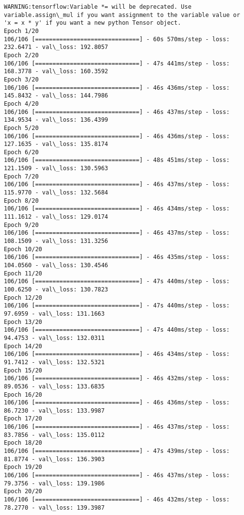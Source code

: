 \documentclass[11pt]{article}
\begin{document}
    \begin{Verbatim}[commandchars=\\\{\}]
WARNING:tensorflow:Variable *= will be deprecated. Use variable.assign\_mul if you want assignment to the variable value or 'x = x * y' if you want a new python Tensor object.
Epoch 1/20
106/106 [==============================] - 60s 570ms/step - loss: 232.6471 - val\_loss: 192.8057
Epoch 2/20
106/106 [==============================] - 47s 441ms/step - loss: 168.3778 - val\_loss: 160.3592
Epoch 3/20
106/106 [==============================] - 46s 436ms/step - loss: 145.8432 - val\_loss: 144.7986
Epoch 4/20
106/106 [==============================] - 46s 437ms/step - loss: 134.9534 - val\_loss: 136.4399
Epoch 5/20
106/106 [==============================] - 46s 436ms/step - loss: 127.1635 - val\_loss: 135.8174
Epoch 6/20
106/106 [==============================] - 48s 451ms/step - loss: 121.1509 - val\_loss: 130.5963
Epoch 7/20
106/106 [==============================] - 46s 437ms/step - loss: 115.9770 - val\_loss: 132.5684
Epoch 8/20
106/106 [==============================] - 46s 434ms/step - loss: 111.1612 - val\_loss: 129.0174
Epoch 9/20
106/106 [==============================] - 46s 437ms/step - loss: 108.1509 - val\_loss: 131.3256
Epoch 10/20
106/106 [==============================] - 46s 435ms/step - loss: 104.0560 - val\_loss: 130.4546
Epoch 11/20
106/106 [==============================] - 47s 440ms/step - loss: 100.6250 - val\_loss: 130.7823
Epoch 12/20
106/106 [==============================] - 47s 440ms/step - loss: 97.6959 - val\_loss: 131.1663
Epoch 13/20
106/106 [==============================] - 47s 440ms/step - loss: 94.4753 - val\_loss: 132.0311
Epoch 14/20
106/106 [==============================] - 46s 434ms/step - loss: 91.7412 - val\_loss: 132.5321
Epoch 15/20
106/106 [==============================] - 46s 432ms/step - loss: 89.0536 - val\_loss: 133.6835
Epoch 16/20
106/106 [==============================] - 46s 436ms/step - loss: 86.7230 - val\_loss: 133.9987
Epoch 17/20
106/106 [==============================] - 46s 437ms/step - loss: 83.7856 - val\_loss: 135.0112
Epoch 18/20
106/106 [==============================] - 47s 439ms/step - loss: 81.8774 - val\_loss: 136.3903
Epoch 19/20
106/106 [==============================] - 46s 437ms/step - loss: 79.3756 - val\_loss: 139.1986
Epoch 20/20
106/106 [==============================] - 46s 432ms/step - loss: 78.2770 - val\_loss: 139.3987

    \end{Verbatim}
\end{document}

